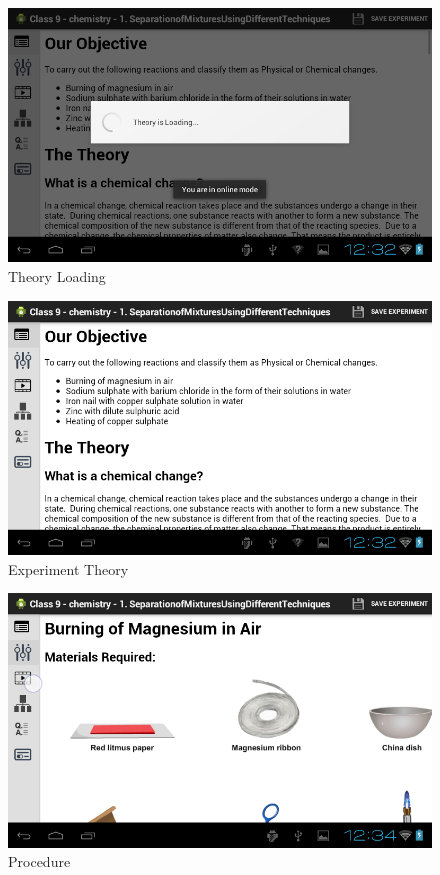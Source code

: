 \documentclass[12pt]{report}
\begin{document}
\begin{figure}[H]
 \centering
 \includegraphics[width=15cm]{./17.png}
 \caption{Theory Loading\label{fig:17}}
\end{figure}


\begin{figure}[H]
 \centering
 \includegraphics[width=15cm]{./18.png}
 \caption{Experiment Theory \label{fig:18}}
\end{figure}

\begin{figure}[H]
 \centering
 \includegraphics[width=15cm]{./20.png}
 \caption{Procedure \label{fig:20}}
\end{figure}
\end{document}
